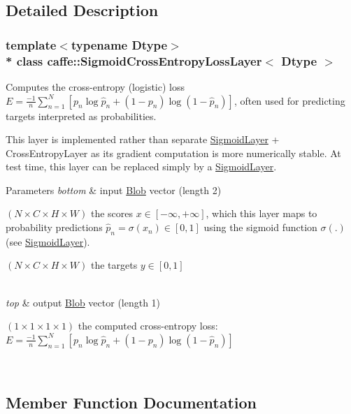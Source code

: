 \subsection{Detailed Description}
\subsubsection*{template$<$typename Dtype$>$\\*
class caffe\+::\+Sigmoid\+Cross\+Entropy\+Loss\+Layer$<$ Dtype $>$}

Computes the cross-\/entropy (logistic) loss $ E = \frac{-1}{n} \sum\limits_{n=1}^N \left[ p_n \log \hat{p}_n + (1 - p_n) \log(1 - \hat{p}_n) \right] $, often used for predicting targets interpreted as probabilities. 

This layer is implemented rather than separate \hyperlink{classcaffe_1_1SigmoidLayer}{Sigmoid\+Layer} + Cross\+Entropy\+Layer as its gradient computation is more numerically stable. At test time, this layer can be replaced simply by a \hyperlink{classcaffe_1_1SigmoidLayer}{Sigmoid\+Layer}.


\begin{DoxyParams}{Parameters}
{\em bottom} & input \hyperlink{classcaffe_1_1Blob}{Blob} vector (length 2)
\begin{DoxyEnumerate}
\item $ (N \times C \times H \times W) $ the scores $ x \in [-\infty, +\infty]$, which this layer maps to probability predictions $ \hat{p}_n = \sigma(x_n) \in [0, 1] $ using the sigmoid function $ \sigma(.) $ (see \hyperlink{classcaffe_1_1SigmoidLayer}{Sigmoid\+Layer}).
\item $ (N \times C \times H \times W) $ the targets $ y \in [0, 1] $ 
\end{DoxyEnumerate}\\
\hline
{\em top} & output \hyperlink{classcaffe_1_1Blob}{Blob} vector (length 1)
\begin{DoxyEnumerate}
\item $ (1 \times 1 \times 1 \times 1) $ the computed cross-\/entropy loss\+: $ E = \frac{-1}{n} \sum\limits_{n=1}^N \left[ p_n \log \hat{p}_n + (1 - p_n) \log(1 - \hat{p}_n) \right] $ 
\end{DoxyEnumerate}\\
\hline
\end{DoxyParams}


\subsection{Member Function Documentation}
